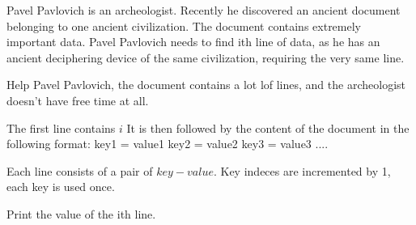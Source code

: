 ﻿Pavel Pavlovich is an archeologist. Recently he discovered an ancient document belonging to one ancient civilization.
The document contains extremely important data. Pavel Pavlovich needs to find ith line of data, as he has an ancient
deciphering device of the same civilization, requiring the very same line.

Help Pavel Pavlovich, the document contains a lot lof lines, and the archeologist doesn't have free time  at all.


\InputFile
The first line contains $i$ 
It is then followed by the content of the document in the following format:
key1 = value1
key2 = value2
key3 = value3
....

Each line consists of a pair of $key - value$. Key indeces are incremented by 1, each key is used once.

\OutputFile
Print the value of the ith line.
